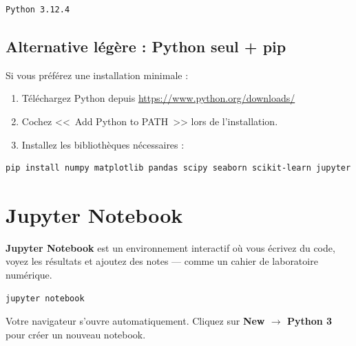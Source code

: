 \begin{codeoutput}
\begin{verbatim}
Python 3.12.4
\end{verbatim}
\end{codeoutput}

\subsection*{Alternative l\'eg\`ere : Python seul + pip}

Si vous pr\'ef\'erez une installation minimale :
\begin{enumerate}
\item T\'el\'echargez Python depuis \url{https://www.python.org/downloads/}
\item Cochez <<~Add Python to PATH~>> lors de l'installation.
\item Installez les biblioth\`eques n\'ecessaires :
\end{enumerate}

\begin{codeblock}[title=\textbf{Terminal}]
\begin{verbatim}
pip install numpy matplotlib pandas scipy seaborn scikit-learn jupyter
\end{verbatim}
\end{codeblock}

\section*{Jupyter Notebook}

\textbf{Jupyter Notebook} est un environnement interactif o\`u vous \'ecrivez du code, voyez les r\'esultats et ajoutez des notes --- comme un cahier de laboratoire num\'erique.

\begin{codeblock}[title=\textbf{Terminal --- Lancer Jupyter}]
\begin{verbatim}
jupyter notebook
\end{verbatim}
\end{codeblock}

Votre navigateur s'ouvre automatiquement. Cliquez sur \textbf{New $\to$ Python 3} pour cr\'eer un nouveau notebook.

\begin{center}
\end{center}

